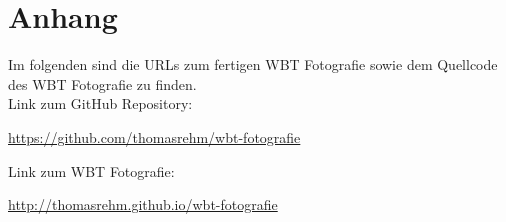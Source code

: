 \documentclass{article}
\begin{document}

\vfill
\pagebreak
%


\section{Anhang}
\label{sec:anhang}
Im folgenden sind die URLs zum fertigen WBT Fotografie sowie dem Quellcode des WBT Fotografie zu finden.\\

Link zum GitHub Repository:

\noindent
\url{https://github.com/thomasrehm/wbt-fotografie}


Link zum WBT Fotografie:

\noindent
\url{http://thomasrehm.github.io/wbt-fotografie}

\noindent
\end{document}
